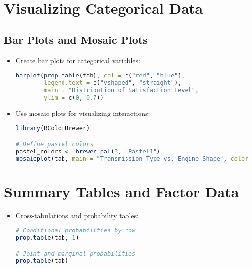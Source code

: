 \section{Visualizing Categorical Data}
\subsection{Bar Plots and Mosaic Plots}
\begin{itemize}
    \item Create bar plots for categorical variables:
\begin{lstlisting}[language=R]
barplot(prop.table(tab), col = c("red", "blue"),
        legend.text = c("vshaped", "straight"),
        main = "Distribution of Satisfaction Level",
        ylim = c(0, 0.7))
\end{lstlisting}

\item Use mosaic plots for visualizing interactions:
\begin{lstlisting}[language=R]
library(RColorBrewer)

# Define pastel colors
pastel_colors <- brewer.pal(3, "Pastel1")
mosaicplot(tab, main = "Transmission Type vs. Engine Shape", color = pastel_colors)
\end{lstlisting}
\end{itemize}

\section{Summary Tables and Factor Data}
\begin{itemize}
    \item Cross-tabulations and probability tables:
\begin{lstlisting}[language=R]
# Conditional probabilities by row
prop.table(tab, 1)

# Joint and marginal probabilities
prop.table(tab)
\end{lstlisting}
\end{itemize}

